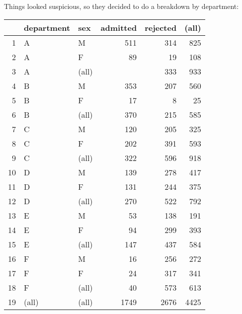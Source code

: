 \documentclass[landscape]{exam}
\begin{document}
  Things looked suspicious, so they decided to do a breakdown by department:

  \begin{table}[H]
    \centering
    \begin{tabular}{rllrrr}
      \toprule
                 & department & sex   & admitted & rejected & (all) \\
      \midrule
      1          & A          & M     & 511      & 314      & 825 \\
      2          & A          & F     & 89       & 19       & 108 \\
      3          & A          & (all) &          & 333      & 933 \\
      \midrule
      4          & B          & M     & 353      & 207      & 560 \\
      5          & B          & F     & 17       & 8        & 25 \\
      6          & B          & (all) & 370      & 215      & 585 \\
      \midrule
      7          & C          & M     & 120      & 205      & 325 \\
      8          & C          & F     & 202      & 391      & 593 \\
      9          & C          & (all) & 322      & 596      & 918 \\
      \midrule
      10         & D          & M     & 139      & 278      & 417 \\
      11         & D          & F     & 131      & 244      & 375 \\
      12         & D          & (all) & 270      & 522      & 792 \\
      \midrule
      13         & E          & M     & 53       & 138      & 191 \\
      14         & E          & F     & 94       & 299      & 393 \\
      15         & E          & (all) & 147      & 437      & 584 \\
      \midrule
      16         & F          & M     & 16       & 256      & 272 \\
      17         & F          & F     & 24       & 317      & 341 \\
      18         & F          & (all) & 40       & 573      & 613 \\
      \midrule
      19         & (all)      & (all) & 1749     & 2676     & 4425 \\
      \bottomrule
    \end{tabular}
  \end{table}
\end{document}
